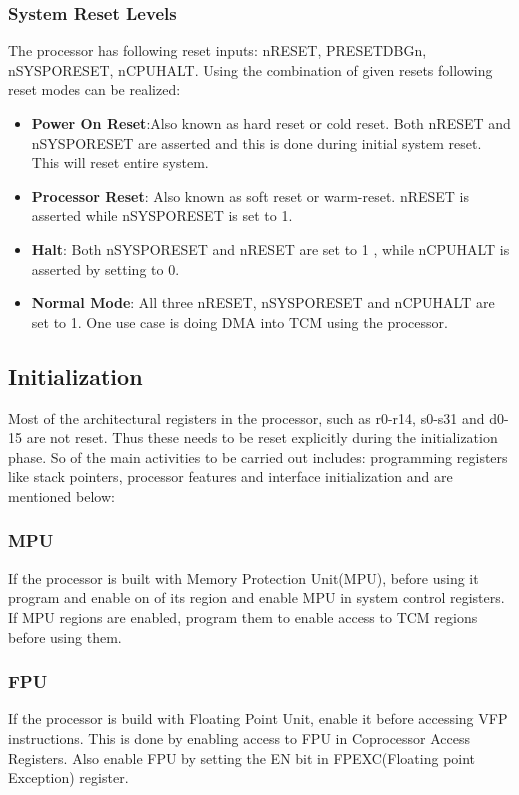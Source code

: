 \subsubsection{\textbf{System Reset Levels}}
The processor has following reset inputs: nRESET, PRESETDBGn, nSYSPORESET, nCPUHALT.
Using the combination of given resets following reset modes can be realized: 
\begin{itemize}
	\item \textbf{Power On Reset}:Also known as hard reset or cold reset. Both nRESET and nSYSPORESET are asserted and this is done during initial system reset. This will reset entire system.
	\item \textbf{Processor Reset}:
	Also known as soft reset or warm-reset. nRESET is asserted while nSYSPORESET is set to 1.
	\item \textbf{Halt}: Both nSYSPORESET and nRESET are set to 1 , while nCPUHALT is asserted by setting to 0.
	\item \textbf{Normal Mode}: All three nRESET, nSYSPORESET and nCPUHALT are set to 1. One use case is doing DMA into TCM using the processor.
\end{itemize}

\subsection{Initialization}
Most of the architectural registers in the processor, such as r0-r14, s0-s31 and d0-15 are not reset. Thus these needs to be reset explicitly during the initialization phase.
So of the main activities to be carried out includes: programming registers like stack pointers, processor features and interface initialization and are mentioned below:
\subsubsection{MPU}
If the processor is built with Memory Protection Unit(MPU), before using it program and enable on of its region and enable MPU in system control registers.
If MPU regions are enabled, program them to enable access to TCM regions before using them.
\subsubsection{FPU}
If the processor is build with Floating Point Unit, enable it before accessing VFP instructions. This is done by enabling access to FPU in Coprocessor Access Registers.
Also enable FPU by setting the EN bit in FPEXC(Floating point Exception) register.

